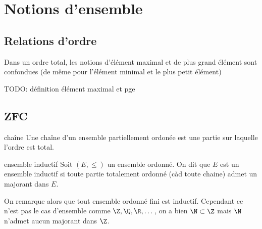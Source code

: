 %
%
%
%
%




\section{Notions d'ensemble}

\subsection{Relations d'ordre}

\begin{remark}{}{}
    Dans un ordre total, les notions d'élément maximal et de plus grand élément sont confondues (de même pour l'élément minimal et le plus petit élément)
\end{remark}

TODO: définition élément maximal et pge


\subsection{ZFC}
\begin{definition}{chaîne}{}
    Une chaîne d'un ensemble partiellement ordonée est une partie sur laquelle l'ordre est total.
\end{definition}

\begin{definition}{ensemble inductif}{}
    Soit $(E, \leqslant)$ un ensemble ordonné. On dit que $E$ est un ensemble inductif si toute partie
    totalement ordonné (càd toute chaine) admet un majorant dans $E$.
\end{definition}

On remarque alors que tout ensemble ordonné fini est inductif. 
Cependant ce n'est pas le cas d'ensemble comme $\Z, \Q, \R, \dots$,
on a bien $\N \subset \Z$ mais $\N$ n'admet aucun majorant dans $\Z$.

